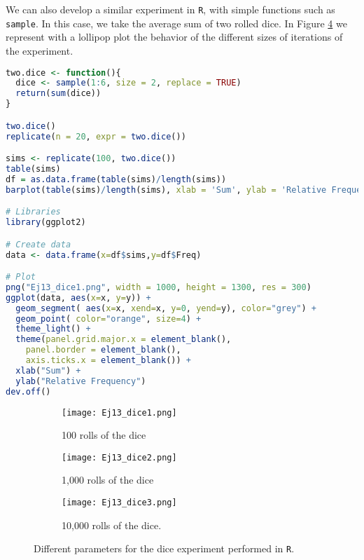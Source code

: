 \documentclass{article}
\begin{document}
We can also develop a similar experiment in \texttt{R}, with simple functions such as \texttt{sample}. In this case, we take the average sum of two rolled dice. In Figure \ref{fig2} we represent with a lollipop plot the behavior of the different sizes of iterations of the experiment.\\

\begin{lstlisting}[language=R, caption=R extract of the code used to perform the dice experiment ]
two.dice <- function(){
  dice <- sample(1:6, size = 2, replace = TRUE)
  return(sum(dice))
}

two.dice()
replicate(n = 20, expr = two.dice())

sims <- replicate(100, two.dice())
table(sims)
df = as.data.frame(table(sims)/length(sims))
barplot(table(sims)/length(sims), xlab = 'Sum', ylab = 'Relative Frequency', main = '100 Rolls of 2 Fair Dice')

# Libraries
library(ggplot2)

# Create data
data <- data.frame(x=df$sims,y=df$Freq)

# Plot
png("Ej13_dice1.png", width = 1000, height = 1300, res = 300)
ggplot(data, aes(x=x, y=y)) +
  geom_segment( aes(x=x, xend=x, y=0, yend=y), color="grey") +
  geom_point( color="orange", size=4) +
  theme_light() +
  theme(panel.grid.major.x = element_blank(),
    panel.border = element_blank(),
    axis.ticks.x = element_blank()) +
  xlab("Sum") +
  ylab("Relative Frequency")
dev.off()

\end{lstlisting}

\begin{figure}[]
\begin{subfigure}{.5\textwidth}
  \centering
  \texttt{[image: Ej13\_dice1.png]}  
  \caption{100 rolls of the dice}
  \label{sb2-1}
\end{subfigure}\hspace{5mm}%
\begin{subfigure}{.5\textwidth}
  \centering
  \texttt{[image: Ej13\_dice2.png]}  
  \caption{1,000 rolls of the dice}
  \label{sb2-2}
\end{subfigure}\hspace{5mm}%
\newline
\begin{subfigure}{1\textwidth}
  \centering
  \texttt{[image: Ej13\_dice3.png]}  
  \caption{10,000 rolls of the dice.}
  \label{sb2-3}
\end{subfigure}
	\caption{Different parameters for the dice experiment performed in \texttt{R}.}
\label{fig2}
\end{figure}
\clearpage
\end{document}
